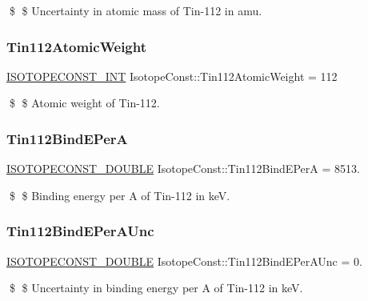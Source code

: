 \$ \$ Uncertainty in atomic mass of Tin-\/112 in amu. \mbox{\label{group___isotope_const-_tin-_sn112_gacb992770efe07a50aa39655755792697}} 
\subsubsection{\texorpdfstring{Tin112\+Atomic\+Weight}{Tin112AtomicWeight}}
{\footnotesize\ttfamily \mbox{\hyperlink{group___isotope_const-_macros_ga5f18360b3e99483a35c32d789e62621c}{I\+S\+O\+T\+O\+P\+E\+C\+O\+N\+S\+T\+\_\+\+I\+NT}} Isotope\+Const\+::\+Tin112\+Atomic\+Weight = 112}

\$ \$ Atomic weight of Tin-\/112. \mbox{\label{group___isotope_const-_tin-_sn112_ga118719045e5ec3ecba1e0e89c1f3de5a}} 
\subsubsection{\texorpdfstring{Tin112\+Bind\+E\+PerA}{Tin112BindEPerA}}
{\footnotesize\ttfamily \mbox{\hyperlink{group___isotope_const-_macros_ga8f45a7272ce02c0b4c65c44636ed719a}{I\+S\+O\+T\+O\+P\+E\+C\+O\+N\+S\+T\+\_\+\+D\+O\+U\+B\+LE}} Isotope\+Const\+::\+Tin112\+Bind\+E\+PerA = 8513.}

\$ \$ Binding energy per A of Tin-\/112 in keV. \mbox{\label{group___isotope_const-_tin-_sn112_gaa2000066d797bc5e51efe80e72a9baa0}} 
\subsubsection{\texorpdfstring{Tin112\+Bind\+E\+Per\+A\+Unc}{Tin112BindEPerAUnc}}
{\footnotesize\ttfamily \mbox{\hyperlink{group___isotope_const-_macros_ga8f45a7272ce02c0b4c65c44636ed719a}{I\+S\+O\+T\+O\+P\+E\+C\+O\+N\+S\+T\+\_\+\+D\+O\+U\+B\+LE}} Isotope\+Const\+::\+Tin112\+Bind\+E\+Per\+A\+Unc = 0.}

\$ \$ Uncertainty in binding energy per A of Tin-\/112 in keV. \mbox{\label{group___isotope_const-_tin-_sn112_gaf37a77ef916f18ae717265ce1ab807c8}} 
